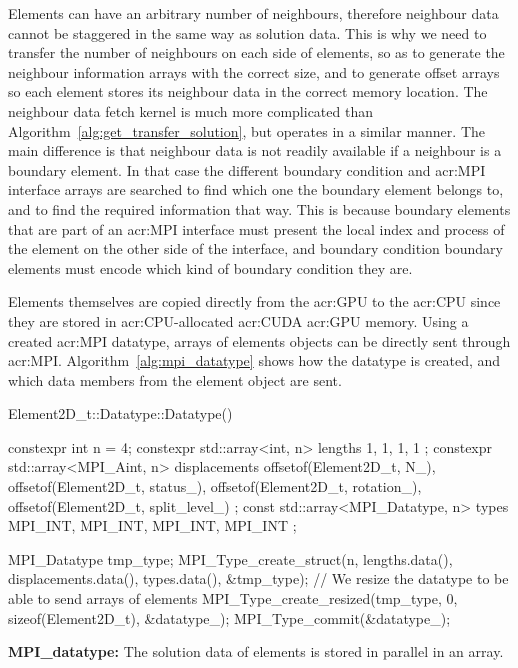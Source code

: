 Elements can have an arbitrary number of neighbours, therefore neighbour data cannot be staggered in
the same way as solution data. This is why we need to transfer the number of neighbours on each side
of elements, so as to generate the neighbour information arrays with the correct size, and to
generate offset arrays so each element stores its neighbour data in the correct memory location. The
neighbour data fetch kernel is much more complicated than Algorithm~\ref{alg:get_transfer_solution},
but operates in a similar manner. The main difference is that neighbour data is not readily
available if a neighbour is a boundary element. In that case the different boundary condition and
\acrshort{acr:MPI} interface arrays are searched to find which one the boundary element belongs to,
and to find the required information that way. This is because boundary elements that are part of an
\acrshort{acr:MPI} interface must present the local index and process of the element on the other
side of the interface, and boundary condition boundary elements must encode which kind of boundary
condition they are.

Elements themselves are copied directly from the \acrshort{acr:GPU} to the \acrshort{acr:CPU} since
they are stored in \acrshort{acr:CPU}-allocated \acrshort{acr:CUDA} \acrshort{acr:GPU} memory. Using
a created \acrshort{acr:MPI} datatype, arrays of elements objects can be directly sent through
\acrshort{acr:MPI}. Algorithm~\ref{alg:mpi_datatype} shows how the datatype is created, and which
data members from the element object are sent.

\begin{algorithm}[H]
    \begin{cuda}
        Element2D_t::Datatype::Datatype() {
            constexpr int n = 4;
            constexpr std::array<int, n> lengths {
                1, 
                1, 
                1, 
                1
            };
            constexpr std::array<MPI_Aint, n> displacements {
                offsetof(Element2D_t, N_), 
                offsetof(Element2D_t, status_), 
                offsetof(Element2D_t, rotation_), 
                offsetof(Element2D_t, split_level_)
            };
            const std::array<MPI_Datatype, n> types {
                MPI_INT, 
                MPI_INT, 
                MPI_INT, 
                MPI_INT
            };

            MPI_Datatype tmp_type;
            MPI_Type_create_struct(n, lengths.data(), 
                displacements.data(), types.data(), &tmp_type);
            // We resize the datatype to be able to send arrays of elements
            MPI_Type_create_resized(tmp_type, 0, sizeof(Element2D_t), &datatype_);
            MPI_Type_commit(&datatype_);
        }\end{cuda}
\caption{\textbf{MPI\_datatype:} The solution data of elements is stored in parallel in an array.}\label{alg:mpi_datatype}
\end{algorithm}

